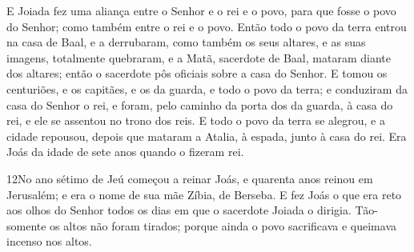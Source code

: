E Joiada fez uma aliança entre o Senhor e o rei e o povo, para
que fosse o povo do Senhor; como também entre o rei e o povo.
Então todo o povo da terra entrou na casa de Baal, e a
derrubaram, como também os seus altares, e as suas imagens,
totalmente quebraram, e a Matã, sacerdote de Baal, mataram diante
dos altares; então o sacerdote pôs oficiais sobre a casa do Senhor.
E tomou os centuriões, e os capitães, e os da guarda, e todo
o povo da terra; e conduziram da casa do Senhor o rei, e foram, pelo
caminho da porta dos da guarda, à casa do rei, e ele se assentou no
trono dos reis. E todo o povo da terra se alegrou, e a cidade
repousou, depois que mataram a Atalia, à espada, junto à casa do
rei. Era Joás da idade de sete anos quando o fizeram rei.

\medskip

\lettrine{12} No ano sétimo de Jeú começou a reinar Joás, e
quarenta anos reinou em Jerusalém; e era o nome de sua mãe Zíbia, de
Berseba. E fez Joás o que era reto aos olhos do Senhor todos os
dias em que o sacerdote Joiada o dirigia. Tão-somente os altos
não foram tirados; porque ainda o povo sacrificava e queimava
incenso nos altos.

